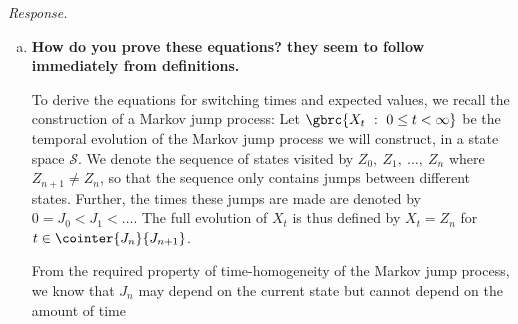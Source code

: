 \textit{Response.} 

\begin{enumerate}[a)]
	\item \textbf{How do you prove these equations? they seem to follow immediately from definitions.}
	
	To derive the equations for switching times and expected values, we recall the construction of a Markov jump process: Let $\gbrc{X_t\ :\ 0 \leq t < \infty}$ be the temporal evolution of the Markov jump process we will construct, in a state space $\mathcal{S}$. We denote the sequence of states visited by $Z_0,\ Z_1,\ \dots,\ Z_{n}$ where $Z_{n+1} \neq Z_{n}$, so that the sequence only contains jumps between different states. Further, the times these jumps are made are denoted by $0 = J_0 < J_1 < \dots$. The full evolution of $X_t$ is thus defined by $X_t = Z_n$ for $t \in \cointer{J_n}{J_{n+1}}$.
	
	From the required property of time-homogeneity of the Markov jump process, we know that $J_n$ may depend on the current state but cannot depend on the amount of time 
\end{enumerate}
